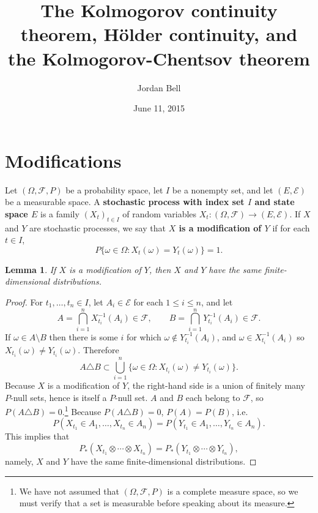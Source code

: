 \documentclass{article}
\newtheorem{lemma}[theorem]{Lemma}
\theoremstyle{definition}
\begin{document}
\title{The Kolmogorov continuity theorem, H\"older continuity, and the Kolmogorov-Chentsov theorem}
\author{Jordan Bell}
\date{June 11, 2015}

\maketitle

\section{Modifications}
Let $(\Omega,\mathscr{F},P)$ be a probability space, let $I$ be a nonempty set, and let
$(E,\mathscr{E})$ be a measurable space. A \textbf{stochastic process with index set $I$ and state space $E$} is a family 
$(X_t)_{t \in I}$ of random variables $X_t:(\Omega,\mathscr{F}) \to (E,\mathscr{E})$.
If $X$ and $Y$ are stochastic processes, we say that \textbf{$X$ is a modification of $Y$} if 
for each $t \in I$, 
\[
P\{\omega \in \Omega: X_t(\omega)=Y_t(\omega)\}=1.
\]

\begin{lemma}
If $X$ is a modification of $Y$, then $X$ and $Y$ have the same finite-dimensional distributions.
\end{lemma}
\begin{proof}
For $t_1,\ldots,t_n \in  I$, let $A_i \in \mathscr{E}$ for each $1 \leq i \leq n$, and let
\[
A = \bigcap_{i=1}^n X_{t_i}^{-1}(A_i) \in \mathscr{F}, \qquad B = \bigcap_{i=1}^n Y_{t_i}^{-1}(A_i) \in \mathscr{F}.
\]
If $\omega \in A \setminus B$ then there is some $i$ for which $\omega \not \in Y_{t_i}^{-1}(A_i)$, and
$\omega \in X_{t_i}^{-1}(A_i)$ so $X_{t_i}(\omega) \neq Y_{t_i}(\omega)$. Therefore
\[
A \triangle B \subset \bigcup_{i=1}^n \{\omega \in \Omega: X_{t_i}(\omega) \neq Y_{t_i}(\omega)\}.
\]
Because $X$ is a modification of $Y$, the right-hand side is a union of finitely many $P$-null sets,
hence is itself a $P$-null set.  $A$ and $B$ each belong to $\mathscr{F}$, so
$P(A \triangle B)=0$.\footnote{We have not assumed that $(\Omega,\mathscr{F},P)$ is a complete measure space, so we must verify
that a set is measurable before speaking about its measure.}
Because $P(A \triangle B)=0$, $P(A)=P(B)$, i.e.
\[
P(X_{t_1} \in A_1, \ldots, X_{t_n} \in A_n) = P(Y_{t_1} \in A_1, \ldots, Y_{t_n} \in A_n).
\]
This implies that
\[
P_*(X_{t_1} \otimes \cdots \otimes X_{t_n}) = P_*(Y_{t_1} \otimes \cdots \otimes Y_{t_n}),
\]
namely,  $X$ and $Y$ have the same finite-dimensional distributions.
\end{proof}
\end{document}

